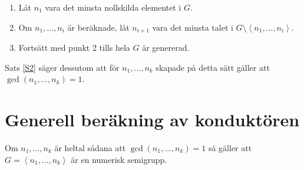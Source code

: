 \begin{enumerate}
\item Låt $n_1$ vara det minsta nollskilda elementet i $G$.

\item Om $n_1, \ldots, n_i$ är beräknade, låt $n_{i+1}$ vara det minsta talet i $G \setminus \left<n_1, \ldots, n_i\right>$.

\item Fortsätt med punkt 2 tills hela $G$ är genererad.
\end{enumerate}

Sats \ref{S2} säger dessutom att för $n_1, \ldots, n_k$ skapade på detta sätt gäller att $\gcd(n_1, \ldots, n_k) = 1$.

\section{Generell beräkning av konduktören}

\begin{Theorem}
\label{S4}
Om $n_1, \ldots, n_k$ är heltal sådana att $\gcd(n_1, \ldots, n_k) = 1$ så gäller att $G = \left<n_1, \ldots, n_k\right>$ är en numerisk semigrupp.
\end{Theorem}


